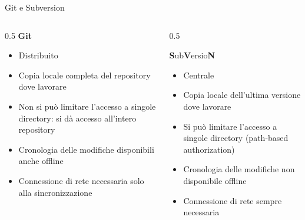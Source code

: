 \documentclass[aspectratio=169,handout,10pt]{beamer}
\begin{document}
\begin{frame}{Git e Subversion}
    \begin{columns}
        \begin{column}{0.5\textwidth}
            \textbf{Git}
            \begin{itemize}
                \item Distribuito
                \item Copia locale completa del repository dove lavorare
                \item Non si può limitare l'accesso a singole directory: si dà accesso all'intero repository
                \item Cronologia delle modifiche disponibili anche offline
                \item Connessione di rete necessaria solo alla sincronizzazione
            \end{itemize}
            
            
        \end{column}
        \begin{column}{0.5\textwidth}
            
            \textbf{S}ub\textbf{V}ersio\textbf{N} 
            \begin{itemize}
                \item Centrale
                \item Copia locale dell'ultima versione dove lavorare
                \item Si può limitare l'accesso a singole directory (path-based authorization)
                \item Cronologia delle modifiche non disponibile offline
                \item Connessione di rete sempre necessaria
            \end{itemize}
            
            
        \end{column}
    \end{columns}
\end{frame}
\end{document}
